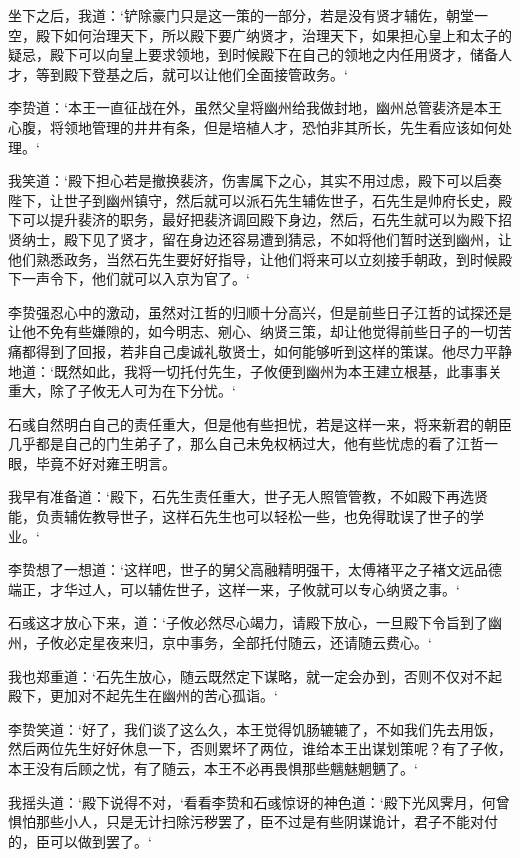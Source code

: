 坐下之后，我道：‘铲除豪门只是这一策的一部分，若是没有贤才辅佐，朝堂一空，殿下如何治理天下，所以殿下要广纳贤才，治理天下，如果担心皇上和太子的疑忌，殿下可以向皇上要求领地，到时候殿下在自己的领地之内任用贤才，储备人才，等到殿下登基之后，就可以让他们全面接管政务。‘

李贽道：‘本王一直征战在外，虽然父皇将幽州给我做封地，幽州总管裴济是本王心腹，将领地管理的井井有条，但是培植人才，恐怕非其所长，先生看应该如何处理。‘

我笑道：‘殿下担心若是撤换裴济，伤害属下之心，其实不用过虑，殿下可以启奏陛下，让世子到幽州镇守，然后就可以派石先生辅佐世子，石先生是帅府长史，殿下可以提升裴济的职务，最好把裴济调回殿下身边，然后，石先生就可以为殿下招贤纳士，殿下见了贤才，留在身边还容易遭到猜忌，不如将他们暂时送到幽州，让他们熟悉政务，当然石先生要好好指导，让他们将来可以立刻接手朝政，到时候殿下一声令下，他们就可以入京为官了。‘

李贽强忍心中的激动，虽然对江哲的归顺十分高兴，但是前些日子江哲的试探还是让他不免有些嫌隙的，如今明志、剜心、纳贤三策，却让他觉得前些日子的一切苦痛都得到了回报，若非自己虔诚礼敬贤士，如何能够听到这样的策谋。他尽力平静地道：‘既然如此，我将一切托付先生，子攸便到幽州为本王建立根基，此事事关重大，除了子攸无人可为在下分忧。‘

石彧自然明白自己的责任重大，但是他有些担忧，若是这样一来，将来新君的朝臣几乎都是自己的门生弟子了，那么自己未免权柄过大，他有些忧虑的看了江哲一眼，毕竟不好对雍王明言。

我早有准备道：‘殿下，石先生责任重大，世子无人照管管教，不如殿下再选贤能，负责辅佐教导世子，这样石先生也可以轻松一些，也免得耽误了世子的学业。‘

李贽想了一想道：‘这样吧，世子的舅父高融精明强干，太傅褚平之子褚文远品德端正，才华过人，可以辅佐世子，这样一来，子攸就可以专心纳贤之事。‘

石彧这才放心下来，道：‘子攸必然尽心竭力，请殿下放心，一旦殿下令旨到了幽州，子攸必定星夜来归，京中事务，全部托付随云，还请随云费心。‘

我也郑重道：‘石先生放心，随云既然定下谋略，就一定会办到，否则不仅对不起殿下，更加对不起先生在幽州的苦心孤诣。‘

李贽笑道：‘好了，我们谈了这么久，本王觉得饥肠辘辘了，不如我们先去用饭，然后两位先生好好休息一下，否则累坏了两位，谁给本王出谋划策呢？有了子攸，本王没有后顾之忧，有了随云，本王不必再畏惧那些魑魅魍魉了。‘

我摇头道：‘殿下说得不对，‘看看李贽和石彧惊讶的神色道：‘殿下光风霁月，何曾惧怕那些小人，只是无计扫除污秽罢了，臣不过是有些阴谋诡计，君子不能对付的，臣可以做到罢了。‘

